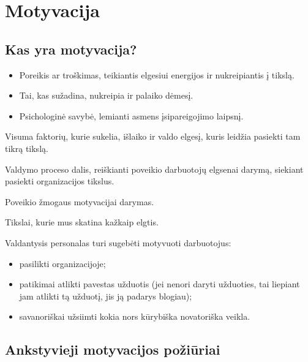 \chapter{Motyvacija}

\section{Kas yra motyvacija?}

\begin{defn}[Motyvacija]
  \begin{itemize}
    \item Poreikis ar troškimas, teikiantis elgesiui energijos ir
      nukreipiantis į tikslą.
    \item Tai, kas sužadina, nukreipia ir palaiko dėmesį.
    \item Psichologinė savybė, lemianti asmens įsipareigojimo laipsnį.
  \end{itemize}
\end{defn}

\begin{defn}[Motyvacija]
  Visuma faktorių, kurie sukelia, išlaiko ir valdo elgesį, kuris leidžia
  pasiekti tam tikrą tikslą.
\end{defn}

\begin{defn}[Motyvavimas]
  Valdymo proceso dalis, reiškianti poveikio darbuotojų elgsenai darymą,
  siekiant pasiekti organizacijos tikslus.
\end{defn}

\begin{defn}[Motyvavimas]
  Poveikio žmogaus motyvacijai darymas.
\end{defn}

\begin{defn}[Motyvai]
  Tikslai, kurie mus skatina kažkaip elgtis.
\end{defn}

Valdantysis personalas turi sugebėti motyvuoti darbuotojus:
\begin{itemize}
  \item pasilikti organizacijoje;
  \item patikimai atlikti pavestas užduotis (jei nenori daryti užduoties,
    tai liepiant jam atlikti tą užduotį, jis ją padarys blogiau);
  \item savanoriškai užsiimti kokia nors kūrybiška novatoriška veikla.
\end{itemize}

\section{Ankstyvieji motyvacijos požiūriai}


